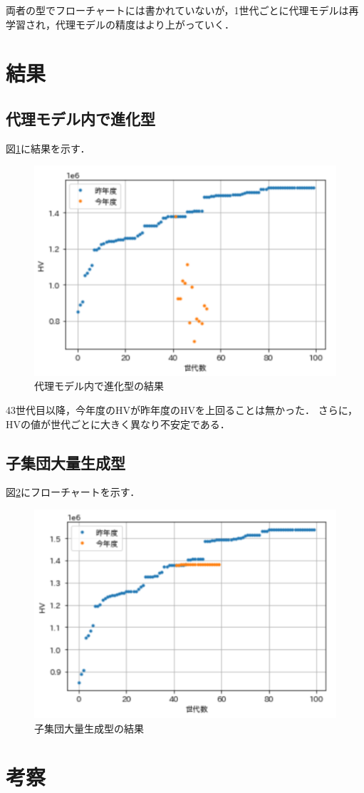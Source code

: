 \documentclass[main]{subfiles}
\begin{document}
        両者の型でフローチャートには書かれていないが，1世代ごとに代理モデルは再学習され，代理モデルの精度はより上がっていく．

    \section{結果}
        \subsection{代理モデル内で進化型}
        図\ref{d_result}に結果を示す．
        \begin{figure}
            \centering
            \includegraphics[width=\linewidth]{figures/d_result.png}
            \caption{代理モデル内で進化型の結果}
            \label{d_result}
        \end{figure}

        43世代目以降，今年度のHVが昨年度のHVを上回ることは無かった．
        さらに，HVの値が世代ごとに大きく異なり不安定である．
        \subsection{子集団大量生成型}
        図\ref{k_result}にフローチャートを示す．
        \begin{figure}
            \centering
            \includegraphics[width=\linewidth]{figures/k_result.png}
            \caption{子集団大量生成型の結果}
            \label{k_result}
        \end{figure}

    \section{考察}
    
\end{document}
